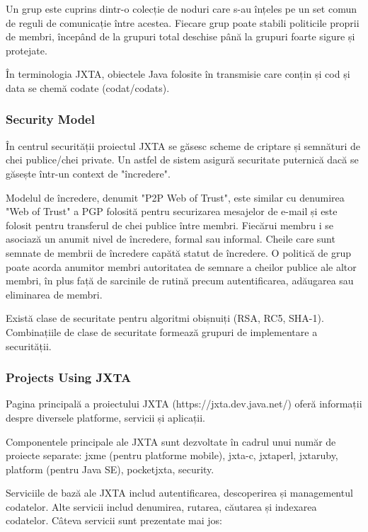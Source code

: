 Un grup este cuprins dintr-o colecție de noduri care s-au înțeles pe un set
comun de reguli de comunicație între acestea. Fiecare grup poate stabili
politicile proprii de membri, începând de la grupuri total deschise până la
grupuri foarte sigure și protejate.

În terminologia JXTA, obiectele Java folosite în transmisie care conțin și cod
și data se chemă codate (codat/codats).

\subsubsection{Security Model}

În centrul securității proiectul JXTA se găsesc scheme de criptare și
semnături de chei publice/chei private. Un astfel de sistem asigură securitate
puternică dacă se găsește într-un context de "încredere".

Modelul de încredere, denumit "P2P Web of Trust", este similar cu denumirea
"Web of Trust" a PGP folosită pentru securizarea mesajelor de e-mail și este
folosit pentru transferul de chei publice între membri. Fiecărui membru i se
asociază un anumit nivel de încredere, formal sau informal. Cheile care sunt
semnate de membrii de încredere capătă statut de încredere. O politică de grup
poate acorda anumitor membri autoritatea de semnare a cheilor publice ale
altor membri, în plus față de sarcinile de rutină precum autentificarea,
adăugarea sau eliminarea de membri.

Există clase de securitate pentru algoritmi obișnuiți (RSA, RC5, SHA-1).
Combinațiile de clase de securitate formează grupuri de implementare a
securității.

\subsubsection{Projects Using JXTA}

Pagina principală a proiectului JXTA (https://jxta.dev.java.net/) oferă
informații despre diversele platforme, servicii și aplicații.

Componentele principale ale JXTA sunt dezvoltate în cadrul unui număr de
proiecte separate: jxme (pentru platforme mobile), jxta-c, jxtaperl, jxtaruby,
platform (pentru Java SE), pocketjxta, security.

Serviciile de bază ale JXTA includ autentificarea, descoperirea și
managementul codatelor. Alte servicii includ denumirea, rutarea, căutarea și
indexarea codatelor. Câteva servicii sunt prezentate mai jos:

